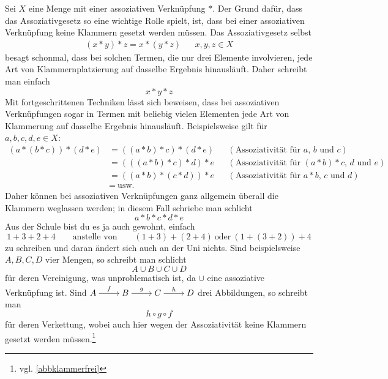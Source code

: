 \begin{bem} \label{klammerfrei}
    Sei $X$ eine Menge mit einer assoziativen Verknüpfung $*$. Der Grund dafür, dass das Assoziativgesetz so eine wichtige Rolle spielt, ist, dass bei einer assoziativen Verknüpfung keine Klammern gesetzt werden müssen. Das Assoziativgesetz selbst
    \begin{align*}
        (x*y)*z = x*(y*z) && x,y,z\in X
    \end{align*}
    besagt schonmal, dass bei solchen Termen, die nur drei Elemente involvieren, jede Art von Klammernplatzierung auf dasselbe Ergebnis hinausläuft. Daher schreibt man einfach
        \[ x*y*z \]
    Mit fortgeschrittenen Techniken lässt sich beweisen, dass bei assoziativen Verknüpfungen sogar in Termen mit beliebig vielen Elementen jede Art von Klammerung auf dasselbe Ergebnis hinausläuft. Beispielsweise gilt für $a,b,c,d,e\in X$:
    \begin{align*}
        (a*(b*c))*(d*e) & =((a*b)*c)*(d*e) && (\text{Assoziativität für $a$, $b$ und $c$})\\
        & = (((a*b)*c)*d)*e && (\text{Assoziativität für $(a*b)*c$, $d$ und $e$})  \\
        & = ((a*b)*(c*d))*e && (\text{Assoziativität für $a*b$, $c$ und $d$})\\
        &=\ \text{usw.}
    \end{align*}
    Daher können bei assoziativen Verknüpfungen ganz allgemein überall die Klammern weglassen werden; in diesem Fall schriebe man schlicht
        \[ a*b*c*d*e \]
    Aus der Schule bist du es ja auch gewohnt, einfach
        \[ 1+3+2+4 \qquad\text{anstelle von}\qquad (1+3)+(2+4)\ \text{oder}\ (1+(3+2))+4 \]
    zu schreiben und daran ändert sich auch an der Uni nichts. Sind beispielsweise $A,B,C,D$ vier Mengen, so schreibt man schlicht
        \[ A\cup B\cup C \cup D \]
    für deren Vereinigung, was unproblematisch ist, da $\cup$ eine assoziative Verknüpfung ist. Sind $\begin{tikzcd}[cramped] A\ar[r, "f"] & B\ar[r, "g"] & C \ar[r, "h"] & D \end{tikzcd}$ drei Abbildungen, so schreibt man
        \[ h\circ g\circ f \]
    für deren Verkettung, wobei auch hier wegen der Assoziativität keine Klammern gesetzt werden müssen.\footnote{vgl. \cref{abbklammerfrei}}
\end{bem}




